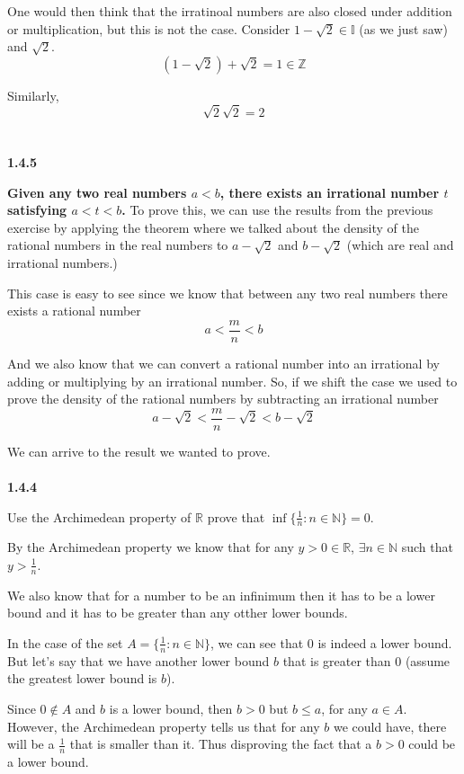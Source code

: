 One would then think that the irratinoal numbers are also closed under addition or multiplication, but this is not the case.
Consider $1 - \sqrt{2} \in \mathbb{I}$ (as we just saw) and $\sqrt{2}$.
$$
( 1 - \sqrt{2} ) + \sqrt{2} = 1 \in \mathbb{Z}
$$

Similarly,
$$
\sqrt{2}\sqrt{2} = 2
$$
\\~\\



\textbf{1.4.5}

\textbf{Given any two real numbers $a < b$, there exists an irrational number $t$ satisfying $a < t < b$.}
To prove this, we can use the results from the previous exercise by applying the theorem where we talked about the
density of the rational numbers in the real numbers to $a - \sqrt{2}$ and $b - \sqrt{2}$
(which are real and irrational numbers.)

This case is easy to see since we know that between any two real numbers there exists a rational number
$$
a < \frac{m}{n} < b
$$

And we also know that we can convert a rational number into an irrational by adding or multiplying by an irrational number.
So, if we shift the case we used to prove the density of the rational numbers by subtracting an irrational number
$$
a - \sqrt{2} < \frac{m}{n} - \sqrt{2} < b - \sqrt{2}
$$

We can arrive to the result we wanted to prove.
\\~\\



\textbf{1.4.4}

Use the Archimedean property of $\mathbb{R}$ prove that $\inf \{ \frac{1}{n} : n \in \mathbb{N} \} = 0$.

By the Archimedean property we know that for any $y>0 \in \mathbb{R}$, $\exists n \in \mathbb{N}$ such that
$y > \frac{1}{n}$.

We also know that for a number to be an infinimum then it has to be a lower bound and it has to be greater than any
otther lower bounds.

In the case of the set $A = \{ \frac{1}{n} : n \in \mathbb{N} \}$, we can see that 0 is indeed a lower bound.
But let's say that we have another lower bound $b$ that is greater than 0 (assume the greatest lower bound is $b$).

Since $0 \notin A$ and $b$ is a lower bound, then $b > 0$ but $b \leq a$, for any $a \in A$.
However, the Archimedean property tells us that for any $b$ we could have, there will be a $\frac{1}{n}$ that is smaller than it.
Thus disproving the fact that a $b>0$ could be a lower bound.
\\~\\



